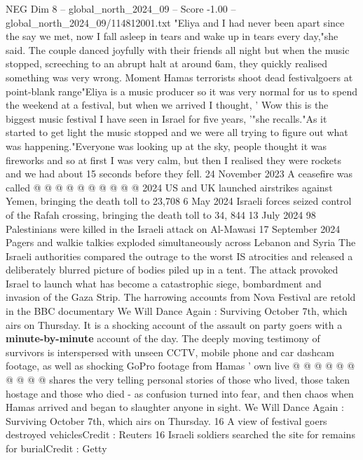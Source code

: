 \begin{textsample}{NEG Dim 8 – global\_north\_2024\_09 – Score -1.00 – global\_north\_2024\_09/114812001.txt}  \label{ex:f8_neg_151}
"Eliya and I had never been apart since the say we met, now I fall asleep in tears and wake up in tears every day,"she said.
The couple danced joyfully with their friends all night but when the music stopped, screeching to an abrupt halt at around 6am, they quickly realised something was very wrong.
Moment Hamas terrorists shoot dead festivalgoers at point-blank range"Eliya is a music producer so it was very normal for us to spend the weekend at a festival, but when we arrived I thought, ' Wow this is the biggest music festival I have seen in Israel for five years, '"she recalls."As it started to get light the music stopped and we were all trying to figure out what was happening."Everyone was looking up at the sky, people thought it was fireworks and so at first I was very calm, but then I realised they were rockets and we had about 15 seconds before they fell. 24 November 2023 A ceasefire was called @ @ @ @ @ @ @ @ @ @ 2024 US and UK launched airstrikes against Yemen, bringing the death toll to 23,708 6 May 2024 Israeli forces seized control of the Rafah crossing, bringing the death toll to 34, 844 13 July 2024 98 Palestinians were killed in the Israeli attack on Al-Mawasi 17 September 2024 Pagers and walkie talkies exploded simultaneously across Lebanon and Syria The Israeli authorities compared the outrage to the worst IS atrocities and released a deliberately blurred picture of bodies piled up in a tent.
The attack provoked Israel to launch what has become a catastrophic siege, bombardment and invasion of the Gaza Strip.
The harrowing accounts from Nova Festival are retold in the BBC documentary We Will Dance Again : Surviving October 7th, which airs on Thursday.
It is a shocking account of the assault on party goers with a \textbf{minute-by-minute} account of the day.
The deeply moving testimony of survivors is interspersed with unseen CCTV, mobile phone and car dashcam footage, as well as shocking GoPro footage from Hamas ' own live @ @ @ @ @ @ @ @ @ @ shares the very telling personal stories of those who lived, those taken hostage and those who died - as confusion turned into fear, and then chaos when Hamas arrived and began to slaughter anyone in sight.
We Will Dance Again : Surviving October 7th, which airs on Thursday. 16 A view of festival goers destroyed vehiclesCredit : Reuters 16 Israeli soldiers searched the site for remains for burialCredit : Getty

\end{textsample}
